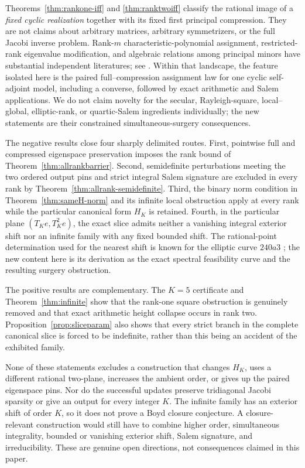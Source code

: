 \documentclass[11pt,reqno]{amsart}
\theoremstyle{definition}
\theoremstyle{remark}
\begin{document}
Theorems~\ref{thm:rankone-iff} and \ref{thm:ranktwoiff} classify the rational
image of a \emph{fixed cyclic realization} together with its fixed first
principal compression.  They are not claims about arbitrary matrices,
arbitrary symmetrizers, or the full Jacobi inverse problem.  Rank-$m$
characteristic-polynomial assignment, restricted-rank eigenvalue
modification, and algebraic relations among principal minors have substantial
independent literatures; see
\cite{merzelm,arbenzgangergolub,alahmadiehvinzant}.  Within that landscape,
the feature isolated here is the paired full--compression assignment law for
one cyclic self-adjoint model, including a converse, followed by exact
arithmetic and Salem applications.  We do not claim novelty for the secular,
Rayleigh-square, local--global, elliptic-rank, or quartic-Salem ingredients
individually; the new statements are their constrained simultaneous-surgery
consequences.

The negative results close four sharply delimited routes.  First, pointwise
full and compressed eigenspace preservation imposes the rank bound of
Theorem~\ref{thm:allrankbarrier}.  Second, semidefinite perturbations meeting
the two ordered output pins and strict integral Salem signature are excluded
in every rank by Theorem~\ref{thm:allrank-semidefinite}.  Third, the binary
norm condition in Theorem~\ref{thm:sameH-norm} and its infinite local
obstruction apply at every rank while the particular canonical form $H_K$
is retained.  Fourth, in the particular plane $(T_Ke,T_K^2e)$, the exact
slice admits neither a vanishing integral exterior shift nor an infinite
family with any fixed bounded shift.  The rational-point determination used
for the nearest shift is known for the elliptic curve $240a3$
\cite{gonzalezxarles}; the new content here is its derivation as the exact
spectral feasibility curve and the resulting surgery obstruction.

The positive results are complementary.  The $K=5$ certificate and
Theorem~\ref{thm:infinite} show that the rank-one square obstruction is
genuinely removed and that exact arithmetic height collapse occurs in rank
two.  Proposition~\ref{prop:sliceparam} also shows that every strict branch
in the complete canonical slice is forced to be indefinite, rather than this
being an accident of the exhibited family.

None of these statements excludes a construction that changes $H_K$, uses a
different rational two-plane, increases the ambient order, or gives up the
paired eigenspace pins.  Nor do the successful updates preserve tridiagonal
Jacobi sparsity or give an output for every integer $K$.  The infinite family
has an exterior shift of order $K$, so it does not prove a Boyd closure
conjecture.  A closure-relevant construction would still have to combine
higher order, simultaneous integrality, bounded or vanishing exterior shift,
Salem signature, and irreducibility.  These are genuine open directions, not
consequences claimed in this paper.
\end{document}
